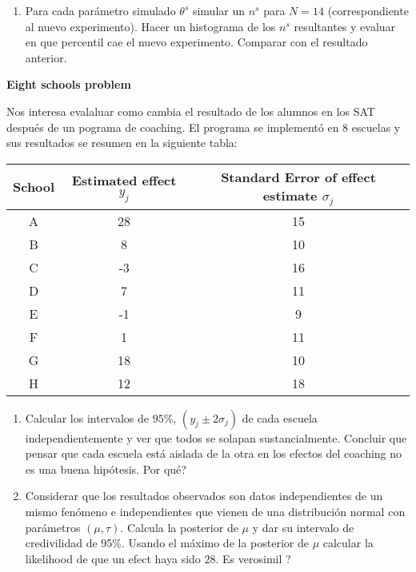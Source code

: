 \documentclass[12pt]{paper}
\begin{document}
\begin{enumerate}
\begin{enumerate}
\item Para cada parámetro simulado $\theta^{s}$ simular un $n^{s}$ para $N = 14$ (correspondiente al nuevo experimento). Hacer un histograma de los $n^{s}$ resultantes y evaluar en que percentil cae el nuevo experimento. Comparar con el resultado anterior.

\end{enumerate}
\newpage
\textbf{Eight schools problem }

Nos interesa evalaluar como cambia el resultado de los alumnos en los SAT después de un pograma de coaching. El programa se implementó en 8 escuelas y sus resultados se resumen en la siguiente tabla:

\begin{table}[!ht]
\centering
\begin{tabular}{ccc}
School & Estimated effect $y_{j}$ & Standard Error of effect estimate $\sigma_{j}$ \\\hline
A      & 28                       & 15                                             \\
B      & 8                        & 10                                             \\
C      & -3                       & 16                                             \\
D      & 7                        & 11                                             \\
E      & -1                       & 9                                              \\
F      & 1                        & 11                                             \\
G      & 18                       & 10                                             \\
H      & 12                       & 18                                            
\end{tabular}
\end{table}
\begin{enumerate}
\item Calcular los intervalos de $95\%$, $(y_{j}\pm 2\sigma_{j})$ de cada escuela independientemente y ver que todos se solapan sustancialmente. Concluir que pensar que cada escuela está aislada de la otra en los efectos del coaching no es una buena hipótesis. Por qué?
\item Considerar que los resultados observados son datos independientes de un  mismo fenómeno e independientes que vienen de una distribución normal con parámetros $(\mu,\tau)$. Calcula la posterior de $\mu$ y dar su intervalo de credivilidad de 95\%. Usando el máximo de la posterior de $\mu$ calcular la likelihood de que un efect haya sido $28$. Es verosimil ?


\end{enumerate}
\end{enumerate}
\end{document}
